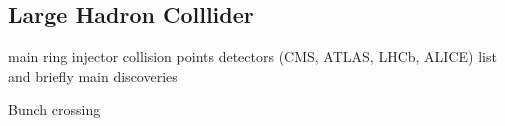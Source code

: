 \subsection{Large Hadron Colllider}
main ring
injector
collision points
detectors (CMS, ATLAS, LHCb, ALICE)
list and briefly main discoveries 

Bunch crossing
